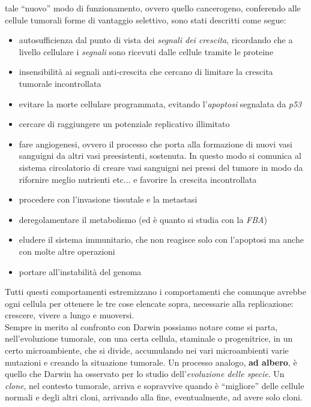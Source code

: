\documentclass[a4paper,12pt, oneside]{book}
\begin{document}
tale ``nuovo'' modo di funzionamento, ovvero quello cancerogeno, conferendo alle
cellule tumorali forme di vantaggio selettivo, sono stati descritti come segue:
\begin{itemize}
  \item autosufficienza dal punto di vista dei \textit{segnali dei crescita},
  ricordando che a livello cellulare i \textit{segnali} sono ricevuti dalle
  cellule tramite le proteine
  \item insensibilità ai segnali anti-crescita che cercano di limitare la
  crescita tumorale incontrollata
  \item evitare la morte cellulare programmata, evitando l'\textit{apoptosi}
  segnalata da \textit{p53}
  \item cercare di raggiungere un potenziale replicativo illimitato 
  \item fare angiogenesi, ovvero il processo che porta alla formazione di nuovi
  vasi sanguigni da altri vasi preesistenti, sostenuta. In questo modo si
  comunica al sistema circolatorio di creare vasi sanguigni nei pressi del
  tumore in modo da rifornire meglio nutrienti etc$\ldots$ e favorire la
  crescita incontrollata 
  \item procedere con l'invasione tissutale e la metastasi
  \item deregolamentare il metabolismo (ed è quanto si studia con la
  \textit{FBA})
  \item eludere il sistema immunitario, che non reagisce solo con l'apoptosi ma
  anche con molte altre operazioni
  \item portare all'instabilità del genoma 
\end{itemize}
Tutti questi comportamenti estremizzano i comportamenti che comunque avrebbe
ogni cellula per ottenere le tre cose elencate sopra, necessarie alla
replicazione: crescere, vivere a lungo e muoversi. \\
Sempre in merito al confronto con Darwin possiamo notare come si parta,
nell'evoluzione tumorale, con una certa cellula, staminale o progenitrice, in un
certo microambiente, che si divide, accumulando nei vari microambienti varie
mutazioni e creando la situazione tumorale. Un processo analogo, \textbf{ad
  albero}, è quello che Darwin ha osservato per lo studio
dell'\textit{evoluzione delle specie}. Un \textit{clone}, nel contesto tumorale,
arriva e sopravvive quando è ``migliore'' delle cellule normali e degli altri
cloni, arrivando alla fine, eventualmente, ad avere solo cloni.
\end{document}
